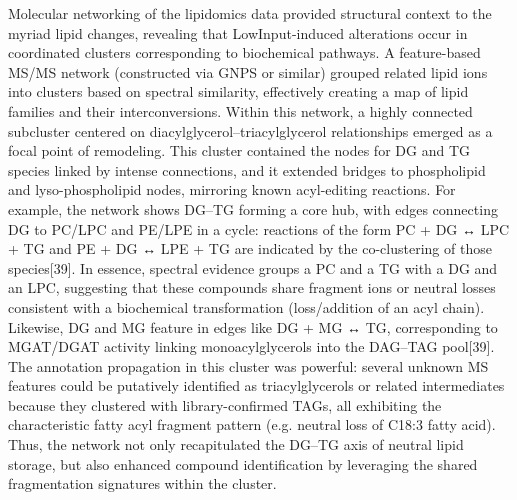 \documentclass[10pt,letterpaper]{article}
\begin{document}
Molecular networking of the lipidomics data provided structural context to the myriad lipid changes, revealing that LowInput-induced alterations occur in coordinated clusters corresponding to biochemical pathways. A feature-based MS/MS network (constructed via GNPS or similar) grouped related lipid ions into clusters based on spectral similarity, effectively creating a map of lipid families and their interconversions. Within this network, a highly connected subcluster centered on diacylglycerol–triacylglycerol relationships emerged as a focal point of remodeling. This cluster contained the nodes for DG and TG species linked by intense connections, and it extended bridges to phospholipid and lyso-phospholipid nodes, mirroring known acyl-editing reactions. For example, the network shows DG–TG forming a core hub, with edges connecting DG to PC/LPC and PE/LPE in a cycle: reactions of the form PC + DG ↔ LPC + TG and PE + DG ↔ LPE + TG are indicated by the co-clustering of those species[39]. In essence, spectral evidence groups a PC and a TG with a DG and an LPC, suggesting that these compounds share fragment ions or neutral losses consistent with a biochemical transformation (loss/addition of an acyl chain). Likewise, DG and MG feature in edges like DG + MG ↔ TG, corresponding to MGAT/DGAT activity linking monoacylglycerols into the DAG–TAG pool[39]. The annotation propagation in this cluster was powerful: several unknown MS features could be putatively identified as triacylglycerols or related intermediates because they clustered with library-confirmed TAGs, all exhibiting the characteristic fatty acyl fragment pattern (e.g. neutral loss of C18:3 fatty acid). Thus, the network not only recapitulated the DG–TG axis of neutral lipid storage, but also enhanced compound identification by leveraging the shared fragmentation signatures within the cluster.
\end{document}
